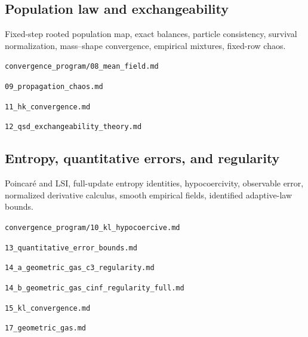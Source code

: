 \documentclass[11pt,a4paper]{article}
\begin{document}
\par\medskip\noindent\begin{minipage}{\linewidth}
\subsection*{Population law and exchangeability}
Fixed-step rooted population map, exact balances, particle consistency, survival normalization, mass--shape convergence, empirical mixtures, fixed-row chaos.

{\small\nolinkurl{convergence_program/08_mean_field.md}\par}
{\small\nolinkurl{09_propagation_chaos.md}\par}
{\small\nolinkurl{11_hk_convergence.md}\par}
{\small\nolinkurl{12_qsd_exchangeability_theory.md}\par}
\end{minipage}\par
\par\medskip\noindent\begin{minipage}{\linewidth}
\subsection*{Entropy, quantitative errors, and regularity}
Poincar\'e and LSI, full-update entropy identities, hypocoercivity, observable error, normalized derivative calculus, smooth empirical fields, identified adaptive-law bounds.

{\small\nolinkurl{convergence_program/10_kl_hypocoercive.md}\par}
{\small\nolinkurl{13_quantitative_error_bounds.md}\par}
{\small\nolinkurl{14_a_geometric_gas_c3_regularity.md}\par}
{\small\nolinkurl{14_b_geometric_gas_cinf_regularity_full.md}\par}
{\small\nolinkurl{15_kl_convergence.md}\par}
{\small\nolinkurl{17_geometric_gas.md}\par}
\end{minipage}\par
\end{document}
